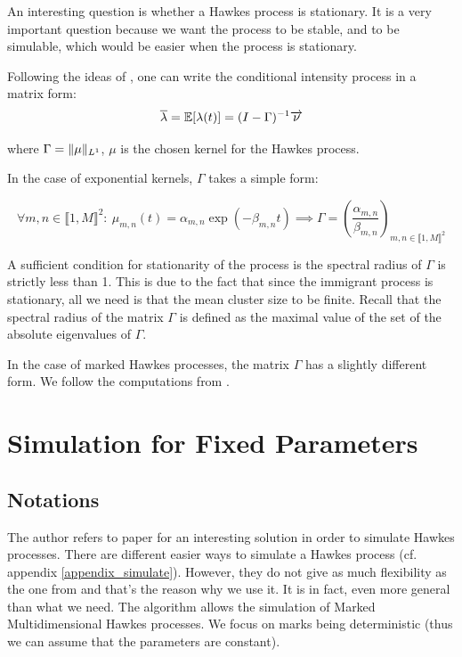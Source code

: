 \documentclass[11pt]{book}
\begin{document}

An interesting question is whether a Hawkes process is stationary. It is a very important question because we want the process to be stable, and to be simulable, which would be easier when the process is stationary.

Following the ideas of \cite{Hawkes}, one can write the conditional intensity process in a matrix form:
\begin{equation}
\overline{\lambda} = \mathbb E [ \lambda(t) ] = (I - \Gamma) ^{-1}\overrightarrow{\nu}  
\end{equation}

where $ \Gamma = \lVert \mu\rVert_{L^1} $,  $\mu$ is the chosen kernel for the Hawkes process.
 
In the case of exponential kernels, $\Gamma$ takes a simple form:

\begin{equation}
\forall m,n \in \llbracket 1, M \rrbracket^2: \  \mu_{m,n} (t) = \alpha_{m,n} \exp ( - \beta_{m,n} t ) \implies \Gamma = \left ( \frac{ \alpha_{m,n} } { \beta_{m,n} } \right )_{ m,n \in \llbracket 1, M \rrbracket^2} 
\end{equation}

A sufficient condition for stationarity of the process is the spectral radius of $\Gamma$ is strictly less than 1. This is due to the fact that since the immigrant process is stationary, all we need is that the mean cluster size to be finite. Recall that the spectral radius of the matrix $\Gamma$ is defined as the maximal value of the set of the absolute eigenvalues of $\Gamma$.

In the case of marked Hawkes processes, the matrix $\Gamma$ has a slightly different form. We follow the computations from \cite{my_algo_simul}.



\section{Simulation for Fixed Parameters}
\subsection{Notations}

The author refers to paper \cite{my_algo_simul} for an interesting solution in order to simulate Hawkes processes. There are different easier ways to simulate a Hawkes process (cf. appendix \ref{appendix_simulate}). However, they do not give as much flexibility as the one from \cite{my_algo_simul} and that's the reason why we use it. It is in fact, even more general than what we need. The algorithm allows the simulation of Marked Multidimensional Hawkes processes. We focus on marks being deterministic (thus we can assume that the parameters are constant).
\end{document}
